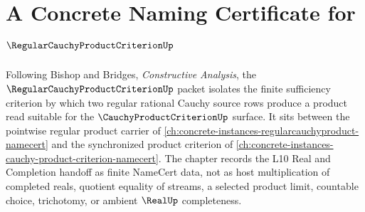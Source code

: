\chapter{A Concrete Naming Certificate for $\RegularCauchyProductCriterionUp$}
\label{ch:concrete-instances-regular-cauchy-product-criterion-namecert}

Following Bishop and Bridges, \emph{Constructive Analysis}, the $\RegularCauchyProductCriterionUp$ packet isolates the finite sufficiency criterion by which two regular rational Cauchy source rows produce a product read suitable for the $\CauchyProductCriterionUp$ surface. It sits between the pointwise regular product carrier of \autoref{ch:concrete-instances-regularcauchyproduct-namecert} and the synchronized product criterion of \autoref{ch:concrete-instances-cauchy-product-criterion-namecert}. The chapter records the L10 Real and Completion handoff as finite NameCert data, not as host multiplication of completed reals, quotient equality of streams, a selected product limit, countable choice, trichotomy, or ambient $\RealUp$ completeness.

